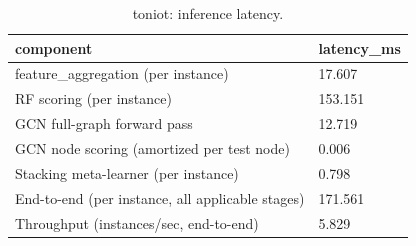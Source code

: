 \begin{table}[t]
\centering
\caption{toniot: inference latency.}
\label{tab:toniot_inference_latency}
\begin{tabular}{ll}
\toprule
component & latency\_ms \\
\midrule
feature\_aggregation (per instance) & 17.607 \\
RF scoring (per instance) & 153.151 \\
GCN full-graph forward pass & 12.719 \\
GCN node scoring (amortized per test node) & 0.006 \\
Stacking meta-learner (per instance) & 0.798 \\
End-to-end (per instance, all applicable stages) & 171.561 \\
Throughput (instances/sec, end-to-end) & 5.829 \\
\bottomrule
\end{tabular}
\end{table}
